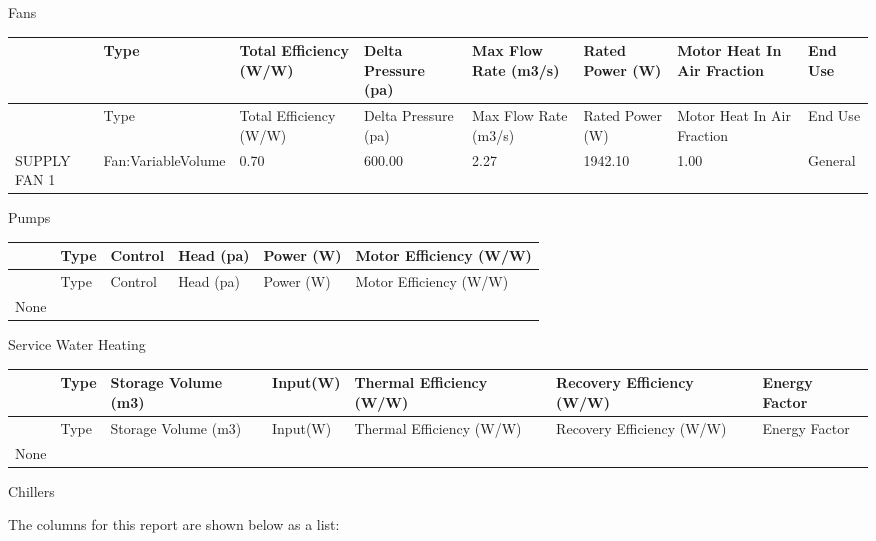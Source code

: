 Fans

{\scriptsize
\begin{longtable}[c]{>{\raggedright}p{0.75in}>{\raggedright}p{0.75in}>{\raggedright}p{0.75in}>{\raggedright}p{0.75in}>{\raggedright}p{0.75in}>{\raggedright}p{0.75in}>{\raggedright}p{0.75in}>{\raggedright}p{0.75in}}
\toprule
~ & Type & Total Efficiency (W/W) & Delta Pressure (pa) & Max Flow Rate (m3/s) & Rated Power (W) & Motor Heat In Air Fraction & End Use \tabularnewline
\midrule
\endfirsthead

\toprule
~ & Type & Total Efficiency (W/W) & Delta Pressure (pa) & Max Flow Rate (m3/s) & Rated Power (W) & Motor Heat In Air Fraction & End Use \tabularnewline
\midrule
\endhead

SUPPLY FAN 1 & Fan:\-Variable\-Volume & 0.70 & 600.00 & 2.27 & 1942.10 & 1.00 & General \tabularnewline
\bottomrule
\end{longtable}}

Pumps

\begin{longtable}[c]{@{}llllll@{}}
\toprule
~ & Type & Control & Head (pa) & Power (W) & Motor Efficiency (W/W) \tabularnewline
\midrule
\endfirsthead

\toprule
~ & Type & Control & Head (pa) & Power (W) & Motor Efficiency (W/W) \tabularnewline
\midrule
\endhead

None & ~ & ~ & ~ & ~ & ~ \tabularnewline
\bottomrule
\end{longtable}

Service Water Heating

\begin{longtable}[c]{>{\raggedright}p{0.85in}>{\raggedright}p{0.85in}>{\raggedright}p{0.85in}>{\raggedright}p{0.85in}>{\raggedright}p{0.85in}>{\raggedright}p{0.85in}>{\raggedright}p{0.85in}}
\toprule
~ & Type & Storage Volume (m3) & Input(W) & Thermal Efficiency (W/W) & Recovery Efficiency (W/W) & Energy Factor \tabularnewline
\midrule
\endfirsthead

\toprule
~ & Type & Storage Volume (m3) & Input(W) & Thermal Efficiency (W/W) & Recovery Efficiency (W/W) & Energy Factor \tabularnewline
\midrule
\endhead

None & ~ & ~ & ~ & ~ & ~ & ~ \tabularnewline
\bottomrule
\end{longtable}

Chillers

The columns for this report are shown below as a list:

